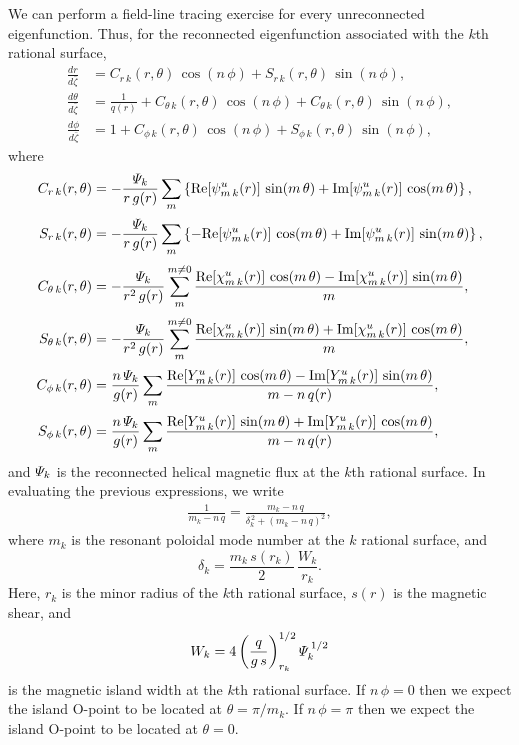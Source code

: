 \documentclass[12pt,prb,aps,notitlepage]{revtex4-1}
\begin{document}
We can perform a field-line tracing exercise for every unreconnected eigenfunction. Thus, for the reconnected eigenfunction associated with the $k$th rational surface, 
\begin{align}
\frac{dr}{d\bar{\zeta}}&= C_{r\,k}(r,\theta)\,\cos(n\,\phi) + S_{r\,k}(r,\theta)\,\sin(n\,\phi),\\[0.5ex]
\frac{d\theta}{d\bar{\zeta}}&=\frac{1}{q(r)}+ C_{\theta\,k}(r,\theta)\,\cos(n\,\phi) + C_{\theta\,k}(r,\theta)\,\sin(n\,\phi),\\[0.5ex]
\frac{d\phi}{d\bar{\zeta}}&= 1+C_{\phi\,k}(r,\theta)\,\cos(n\,\phi) + S_{\phi\,k}(r,\theta)\,\sin(n\,\phi),
\end{align}
where
\begin{align}
C_{r\,k}(r,\theta)&=-\frac{{\mit\Psi}_k}{r\,g(r)}\sum_m\left\{{\rm Re}[\psi_{m\,k}^u(r)]\,\sin(m\,\theta) + {\rm Im}[\psi_{m\,k}^u(r)]\,\cos(m\,\theta)\right\},\\[0.5ex]
S_{r\,k}(r,\theta)&=-\frac{{\mit\Psi}_k}{r\,g(r)}\sum_m\left\{ -{\rm Re}[\psi_{m\,k}^u(r)]\,\cos(m\,\theta) + {\rm Im}[\psi_{m\,k}^u(r)]\,\sin(m\,\theta)\right\},\\[0.5ex]
C_{\theta\,k}(r,\theta)&=-\frac{{\mit\Psi}_k}{r^2\,g(r)}\sum_{m}^{m\neq 0}\frac{{\rm Re}[\chi_{m\,k}^u(r)]\,\cos(m\,\theta) - {\rm Im}[\chi_{m\,k}^u(r)]\,\sin(m\,\theta)}{m},\\[0.5ex]
S_{\theta\,k}(r,\theta)&=-\frac{{\mit\Psi}_k}{r^2\,g(r)}\sum_{m}^{m\neq 0}\frac{{\rm Re}[\chi_{m\,k}^u(r)]\,\sin(m\,\theta) + {\rm Im}[\chi_{m\,k}^u(r)]\,\cos(m\,\theta)}{m},\\[0.5ex]
C_{\phi\,k}(r,\theta)&=\frac{n\,{\mit\Psi}_k}{g(r)}\sum_{m}\frac{{\rm Re}[Y_{m\,k}^u(r)]\,\cos(m\,\theta) - {\rm Im}[Y_{m\,k}^u(r)]\,\sin(m\,\theta)}{m-n\,q(r)},\\[0.5ex]
S_{\phi\,k}(r,\theta)&=\frac{n\,{\mit\Psi}_k}{g(r)}\sum_{m}\frac{{\rm Re}[Y_{m\,k}^u(r)]\,\sin(m\,\theta) + {\rm Im}[Y_{m\,k}^u(r)]\,\cos(m\,\theta)}{m-n\,q(r)},
\end{align}
and ${\mit\Psi}_k$ is the reconnected helical magnetic flux at the $k$th rational surface. 
In evaluating the previous expressions, we write
\begin{align}
\frac{1}{m_k-n\,q} = \frac{m_k-n\,q}{\delta_k^{\,2} + (m_k-n\,q)^2},
\end{align}
where $m_k$ is the resonant poloidal mode number at the $k$ rational surface, and
\begin{equation}
\delta_k = \frac{m_k\,s(r_k)}{2}\,\frac{W_k}{r_k}.
\end{equation}
Here, $r_k$ is the minor radius of the $k$th rational surface, $s(r)$ is the magnetic shear, and 
\begin{equation}
W_k = 4\left(\frac{q}{g\,s}\right)_{r_k}^{1/2}{\mit\Psi}_k^{\,1/2}
\end{equation}
is the magnetic island width at the $k$th rational surface. If $n\,\phi=0$ then we expect the island O-point to be located at $\theta=\pi/m_k$. If $n\,\phi=\pi$ then
we expect the island O-point to be located at $\theta=0$. 
\fi
\end{document}
